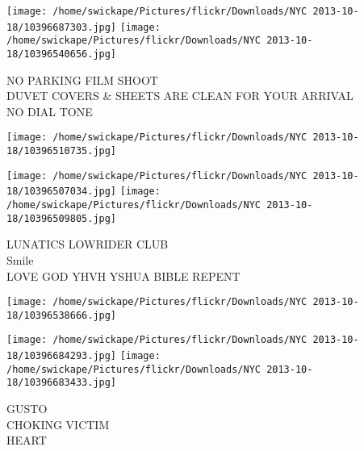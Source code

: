 \documentclass[10pt,letterpaper]{article}
\begin{document}
\vspace{0.25in}
\texttt{[image: /home/swickape/Pictures/flickr/Downloads/NYC 2013-10-18/10396687303.jpg]}
\texttt{[image: /home/swickape/Pictures/flickr/Downloads/NYC 2013-10-18/10396540656.jpg]}

NO PARKING FILM SHOOT\\
DUVET COVERS \& SHEETS ARE CLEAN FOR YOUR ARRIVAL\\
NO DIAL TONE\\
\pagebreak

\texttt{[image: /home/swickape/Pictures/flickr/Downloads/NYC 2013-10-18/10396510735.jpg]}

\vspace{0.25in}
\texttt{[image: /home/swickape/Pictures/flickr/Downloads/NYC 2013-10-18/10396507034.jpg]}
\texttt{[image: /home/swickape/Pictures/flickr/Downloads/NYC 2013-10-18/10396509805.jpg]}

LUNATICS LOWRIDER CLUB\\
Smile\\
LOVE GOD YHVH YSHUA BIBLE REPENT\\
\pagebreak

\texttt{[image: /home/swickape/Pictures/flickr/Downloads/NYC 2013-10-18/10396538666.jpg]}

\vspace{0.25in}
\texttt{[image: /home/swickape/Pictures/flickr/Downloads/NYC 2013-10-18/10396684293.jpg]}
\texttt{[image: /home/swickape/Pictures/flickr/Downloads/NYC 2013-10-18/10396683433.jpg]}

GUSTO\\
CHOKING VICTIM\\
HEART\\
\pagebreak
\end{document}
